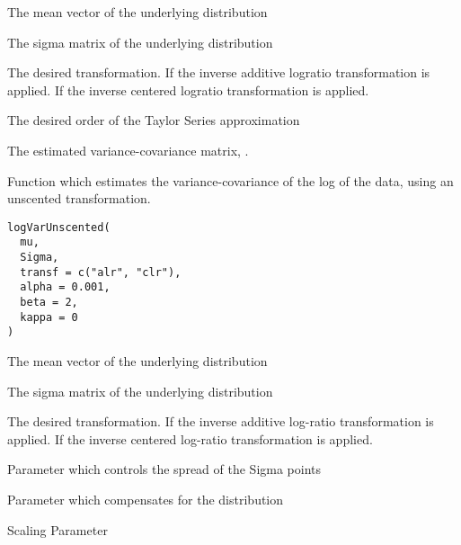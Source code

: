\documentclass[a4paper]{book}
\begin{document}
%
\begin{Arguments}
\begin{ldescription}
\item[\code{mu}] The mean vector of the underlying distribution

\item[\code{Sigma}] The sigma matrix of the underlying distribution

\item[\code{transf}] The desired transformation. If  the inverse 
additive logratio transformation is applied. If  the
inverse centered logratio transformation is applied.

\item[\code{order}] The desired order of the Taylor Series approximation
\end{ldescription}
\end{Arguments}
%
\begin{Value}
The estimated variance-covariance matrix, .
\end{Value}
%
\begin{Description}\relax
Function which estimates the variance-covariance of the log of the data, using an 
unscented transformation.
\end{Description}
%
\begin{Usage}
\begin{verbatim}
logVarUnscented(
  mu,
  Sigma,
  transf = c("alr", "clr"),
  alpha = 0.001,
  beta = 2,
  kappa = 0
)
\end{verbatim}
\end{Usage}
%
\begin{Arguments}
\begin{ldescription}
\item[\code{mu}] The mean vector of the underlying distribution

\item[\code{Sigma}] The sigma matrix of the underlying distribution

\item[\code{transf}] The desired transformation. If  the inverse 
additive log-ratio transformation is applied. If  the
inverse centered log-ratio transformation is applied.

\item[\code{alpha}] Parameter which controls the spread of the Sigma points

\item[\code{beta}] Parameter which compensates for the distribution

\item[\code{kappa}] Scaling Parameter
\end{ldescription}
\end{Arguments}
\end{document}
